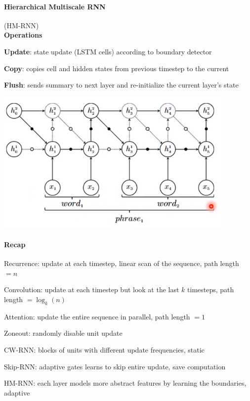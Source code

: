 \documentclass[10pt]{report}
\begin{document}
\paragraph{Hierarchical Multiscale RNN} (HM-RNN)\\
\textbf{Operations}\begin{list}{}{}
	\item \textbf{Update}: state update (LSTM cells) according to boundary detector
	\item \textbf{Copy}: copies cell and hidden states from previous timestep to the current
	\item \textbf{Flush}: sends summary to next layer and re-initialize the current layer's state
\end{list}
\begin{center}
	\includegraphics[scale=0.5]{126.png}
\end{center}
\paragraph{Recap}\begin{list}{}{}
	\item Recurrence: update at each timestep, linear scan of the sequence, path length $=n$
	\item Convolution: update at each timestep but look at the last $k$ timesteps, path length $=\log_k(n)$
	\item Attention: update the entire sequence in parallel, path length $=1$
	\item Zoneout: randomly disable unit update
	\item CW-RNN: blocks of units with different update frequencies, static
	\item Skip-RNN: adaptive gates learns to skip entire update, save computation
	\item HM-RNN: each layer models more abstract features by learning the boundaries, adaptive
\end{list}
\pagebreak
\end{document}
